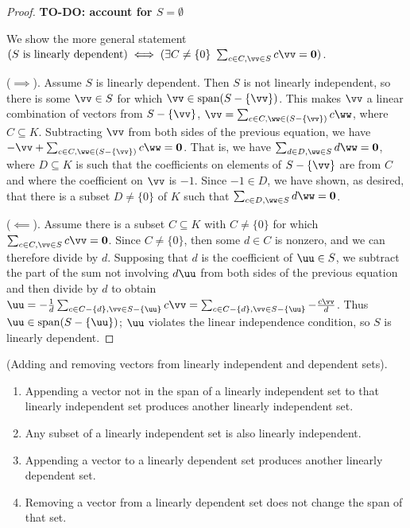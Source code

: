 \begin{proof}
    \textbf{TO-DO: account for $S = \emptyset$}
     
   We show the more general statement $(\text{$S$ is linearly dependent}) \iff (\exists C \neq \{0\} \spc \sum_{c \in C, \vv \in S} c \vv = \mathbf{0})$.
   
   ($\implies$). Assume $S$ is linearly dependent. Then $S$ is not linearly independent, so there is some $\vv \in S$ for which $\vv \in \spann(S - \{\vv\})$. This makes $\vv$ a linear combination of vectors from $S - \{\vv\}$, $\vv = \sum_{c \in C, \ww \in (S - \{\vv\})} c \ww$, where $C \subseteq K$. Subtracting $\vv$ from both sides of the previous equation, we have $-\vv + \sum_{c \in C, \ww \in (S - \{\vv\})} c \ww = \mathbf{0}$. That is, we have $\sum_{d \in D, \ww \in S} d \ww = \mathbf{0}$, where $D \subseteq K$ is such that the coefficients on elements of $S - \{\vv\}$ are from $C$ and where the coefficient on $\vv$ is $-1$. Since $-1 \in D$, we have shown, as desired, that there is a subset $D \neq \{0\}$ of $K$ such that $\sum_{c \in D, \ww \in S} d \ww = \mathbf{0}$.
   
   ($\impliedby$). Assume there is a subset $C \subseteq K$ with $C \neq \{0\}$ for which $\sum_{c \in C, \vv \in S} c \vv = \mathbf{0}$. Since $C \neq \{0\}$, then some $d \in C$ is nonzero, and we can therefore divide by $d$. Supposing that $d$ is the coefficient of $\uu \in S$, we subtract the part of the sum not involving $d \uu$ from both sides of the previous equation and then divide by $d$ to obtain $\uu = -\frac{1}{d}\sum_{c \in C - \{d\}, \vv \in S - \{\uu\}} c \vv = \sum_{c \in C - \{d\}, \vv \in S - \{\uu\}} - \frac{c \vv}{d}$. Thus $\uu \in \spann(S - \{\uu\})$; $\uu$ violates the linear independence condition, so $S$ is linearly dependent.
\end{proof}

\begin{lemma}
    \label{ch::lin_alg::lemma::adding_removing_vectors_li_ld_sets}
    (Adding and removing vectors from linearly independent and dependent sets).

    \begin{enumerate}
        \item Appending a vector not in the span of a linearly independent set to that linearly independent set produces another linearly independent set.
        \item Any subset of a linearly independent set is also linearly independent.
        \item Appending a vector to a linearly dependent set produces another linearly dependent set.
        \item Removing a vector from a linearly dependent set does not change the span of that set.
    \end{enumerate}
\end{lemma}

